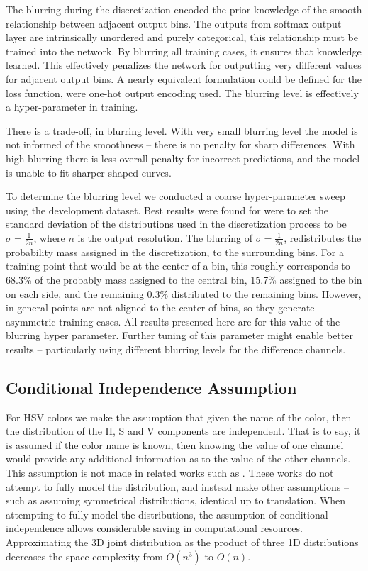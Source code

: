 \documentclass[11pt,letterpaper]{article}
\newcommand{\textcite}{\newcite}
\begin{document}
The blurring during the discretization encoded the prior knowledge of the smooth relationship between adjacent output bins.
The outputs from softmax output layer are intrinsically unordered and purely categorical, this relationship must be trained into the network.
By blurring all training cases, it ensures that knowledge learned.
This effectively penalizes the network for outputting very different values for adjacent output bins.
A nearly equivalent formulation could be defined for the loss function, were one-hot output encoding used.
The blurring level is effectively a hyper-parameter in training.

There is a trade-off, in blurring level.
With very small blurring level the model is not informed of the smoothness -- there is no penalty for sharp differences.
With high blurring there is less overall penalty for incorrect predictions,
and the model is unable to fit sharper shaped curves.

To determine the blurring level we conducted a coarse hyper-parameter sweep using the development dataset.
Best results were found for were to set the standard deviation of the distributions used in the discretization process to be $\sigma=\frac{1}{2n}$, where $n$ is the output resolution.
The blurring of $\sigma=\frac{1}{2n}$, redistributes the probability mass assigned in the discretization, to the surrounding bins.
For a training point that would be at the center of a bin, this roughly corresponds to 68.3\% of the probably mass assigned to the central bin, 15.7\% assigned to the bin on each side, and the remaining 0.3\% distributed to the remaining bins.
However, in general points are not aligned to the center of bins, so they generate asymmetric training cases.
All results presented here are for this value of the blurring hyper parameter.
Further tuning of this parameter might enable better results -- particularly using different blurring levels for the difference channels.


\subsection{Conditional Independence Assumption}\label{sec:conditional-independence-assumption}
For HSV colors we make the assumption that given the name of the color, then the distribution of the H, S and V components are independent.
That is to say, it is assumed if the color name is known, then  knowing the value of one channel would provide any additional information as to the value  of the other channels.
This assumption is not made in related works such as \textcite{DBLP:journals/corr/MonroeHGP17,DBLP:journals/corr/KawakamiDRS16}.
These works do not attempt to fully model the distribution,
and instead make other assumptions -- such as assuming symmetrical distributions, identical up to translation.
When attempting to fully model the distributions, the assumption of conditional independence allows considerable saving in computational resources.
Approximating the 3D joint distribution as the product of three 1D distributions decreases the space complexity from $O(n^3)$ to $O(n)$.
\end{document}
